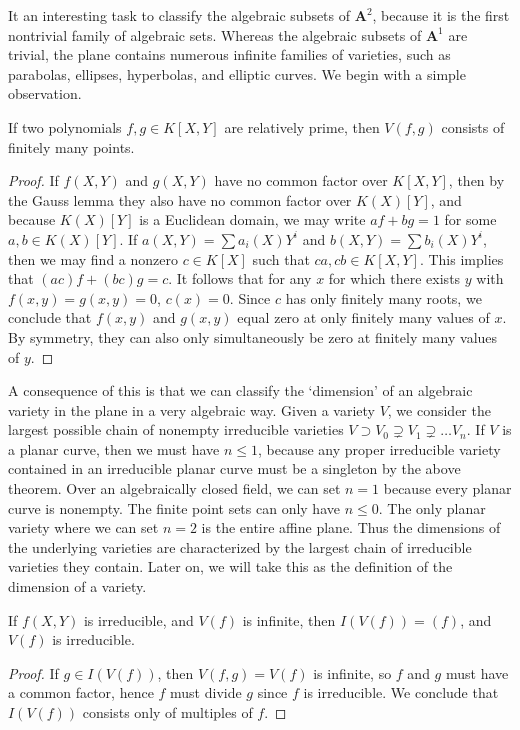 It an interesting task to classify the algebraic subsets of $\mathbf{A}^2$, because it is the first nontrivial family of algebraic sets. Whereas the algebraic subsets of $\mathbf{A}^1$ are trivial, the plane contains numerous infinite families of varieties, such as parabolas, ellipses, hyperbolas, and elliptic curves. We begin with a simple observation.

\begin{theorem}
    If two polynomials $f,g \in K[X,Y]$ are relatively prime, then $V(f,g)$ consists of finitely many points.
\end{theorem}
\begin{proof}
    If $f(X,Y)$ and $g(X,Y)$ have no common factor over $K[X,Y]$, then by the Gauss lemma they also have no common factor over $K(X)[Y]$, and because $K(X)[Y]$ is a Euclidean domain, we may write $af + bg = 1$ for some $a,b \in K(X)[Y]$. If $a(X,Y) = \sum a_i(X)Y^i$ and $b(X,Y) = \sum b_i(X) Y^i$, then we may find a nonzero $c \in K[X]$ such that $ca, cb \in K[X,Y]$. This implies that $(ac)f + (bc)g = c$. It follows that for any $x$ for which there exists $y$ with $f(x,y) = g(x,y) = 0$, $c(x) = 0$. Since $c$ has only finitely many roots, we conclude that $f(x,y)$ and $g(x,y)$ equal zero at only finitely many values of $x$. By symmetry, they can also only simultaneously be zero at finitely many values of $y$.
\end{proof}

A consequence of this is that we can classify the `dimension' of an algebraic variety in the plane in a very algebraic way. Given a variety $V$, we consider the largest possible chain of nonempty irreducible varieties $V \supset V_0 \supsetneq V_1 \supsetneq \dots V_n$. If $V$ is a planar curve, then we must have $n \leq 1$, because any proper irreducible variety contained in an irreducible planar curve must be a singleton by the above theorem. Over an algebraically closed field, we can set $n = 1$ because every planar curve is nonempty. The finite point sets can only have $n \leq 0$. The only planar variety where we can set $n = 2$ is the entire affine plane. Thus the dimensions of the underlying varieties are characterized by the largest chain of irreducible varieties they contain. Later on, we will take this as the definition of the dimension of a variety.

\begin{corollary}
    If $f(X,Y)$ is irreducible, and $V(f)$ is infinite, then $I(V(f)) = (f)$, and $V(f)$ is irreducible.
\end{corollary}
\begin{proof}
    If $g \in I(V(f))$, then $V(f,g) = V(f)$ is infinite, so $f$ and $g$ must have a common factor, hence $f$ must divide $g$ since $f$ is irreducible. We conclude that $I(V(f))$ consists only of multiples of $f$.
\end{proof}


